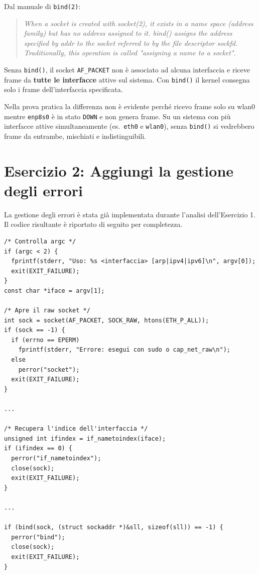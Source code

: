 \documentclass[a4paper,12pt]{article}
\begin{document}
Dal manuale di \texttt{bind(2)}:

\begin{quote}
\textit{When a socket is created with socket(2), it exists in a name space
(address family) but has no address assigned to it. bind() assigns the address
specified by addr to the socket referred to by the file descriptor sockfd.
Traditionally, this operation is called "assigning a name to a socket".}
\end{quote}

Senza \texttt{bind()}, il socket \texttt{AF\_PACKET} non è associato ad alcuna interfaccia
e riceve frame da \textbf{tutte le interfacce} attive sul sistema. Con \texttt{bind()}
il kernel consegna solo i frame dell'interfaccia specificata.

Nella prova pratica la differenza non è evidente perché ricevo frame solo
su wlan0 mentre \texttt{enp8s0} è in stato \texttt{DOWN} e non genera frame. 
Su un sistema con più interfacce attive simultaneamente (es.\ \texttt{eth0}
e \texttt{wlan0}), senza \texttt{bind()} si vedrebbero frame da entrambe, mischiati e
indistinguibili.

\section{Esercizio 2: Aggiungi la gestione degli errori}

La gestione degli errori è stata già implementata durante l'analisi
dell'Esercizio 1.
Il codice risultante è riportato di seguito per completezza.

\begin{lstlisting}[caption={Gestione errori -- sniffer.c}]
/* Controlla argc */
if (argc < 2) {
  fprintf(stderr, "Uso: %s <interfaccia> [arp|ipv4|ipv6]\n", argv[0]);
  exit(EXIT_FAILURE);
}
const char *iface = argv[1];

/* Apre il raw socket */
int sock = socket(AF_PACKET, SOCK_RAW, htons(ETH_P_ALL));
if (sock == -1) {
  if (errno == EPERM)
    fprintf(stderr, "Errore: esegui con sudo o cap_net_raw\n");
  else
    perror("socket");
  exit(EXIT_FAILURE);
}

...

/* Recupera l'indice dell'interfaccia */
unsigned int ifindex = if_nametoindex(iface);
if (ifindex == 0) {
  perror("if_nametoindex");
  close(sock);
  exit(EXIT_FAILURE);
}

...

if (bind(sock, (struct sockaddr *)&sll, sizeof(sll)) == -1) {
  perror("bind");
  close(sock);
  exit(EXIT_FAILURE);
}
\end{lstlisting}
\end{document}
